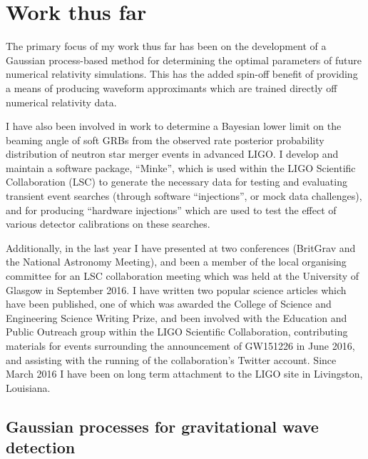 \documentclass[openleft]{kentigern}
\theoremstyle{definition}
\begin{document}


\chapter{Work thus far}
\chapterprecis{}
The primary focus of my work thus far has been on the development of a
Gaussian process-based method for determining the optimal parameters
of future numerical relativity simulations. This has the added
spin-off benefit of providing a means of producing waveform
approximants which are trained directly off numerical relativity data.

I have also been involved in work to determine a Bayesian lower limit
on the beaming angle of soft GRBs from the observed rate posterior
probability distribution of neutron star merger events in advanced
LIGO. I develop and maintain a software package, ``Minke'', which is
used within the LIGO Scientific Collaboration (LSC) to generate the
necessary data for testing and evaluating transient event searches
(through software ``injections'', or mock data challenges), and for
producing ``hardware injections'' which are used to test the effect of
various detector calibrations on these searches.

Additionally, in the last year I have presented at two conferences
(BritGrav and the National Astronomy Meeting), and been a member of
the local organising committee for an LSC collaboration meeting which
was held at the University of Glasgow in September 2016. I have
written two popular science articles which have been published, one of
which was awarded the College of Science and Engineering Science
Writing Prize, and been involved with the Education and Public
Outreach group within the LIGO Scientific Collaboration, contributing
materials for events surrounding the announcement of GW151226 in June
2016, and assisting with the running of the collaboration's Twitter
account. Since March 2016 I have been on long term attachment to the
LIGO site in Livingston, Louisiana.

\section{Gaussian processes for gravitational wave detection}
\label{sec:gauss-proc-grav}
\end{document}
